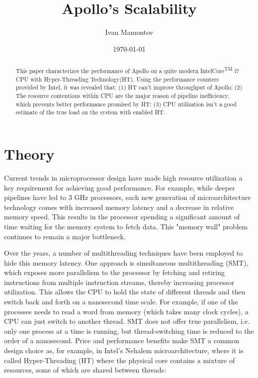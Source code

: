 \documentclass[12pt]{article}
\title{Apollo's Scalability}
\date{\today}
\author{Ivan Mamontov}
\begin{document}
\maketitle

\tableofcontents{}

\begin{abstract}

This paper characterizes the performance of Apollo on a quite modern Intel\circledR Core\textsuperscript{TM} i7 CPU with Hyper-Threading Technology(HT). Using the performance counters provided by Intel, it was revealed that: (1) HT can't improve throughput of Apollo; (2) The resource contentions within CPU are the major reason of pipeline inefficiency, which prevents better performance promised by HT; (3) CPU utilization isn't a good estimate of the true load on the system with enabled HT.

\end{abstract}

\section{Theory}

Current trends in microprocessor design have made high resource utilization a key requirement for achieving good performance. For example, while deeper pipelines have led to 3 GHz processors, each new generation of microarchitecture technology comes with increased memory latency and a decrease in relative memory speed. This results in the processor spending a significant amount of time waiting for the memory system to fetch data. This "memory wall" problem continues to remain a major bottleneck\cite{impact}.

Over the years, a number of multithreading techniques have been employed to hide this memory latency. One approach is simultaneous multithreading (SMT), which exposes more parallelism to the processor by fetching and retiring instructions from multiple instruction streams, thereby increasing processor utilization. This allows the CPU to hold the state of different threads and then switch back and forth on a nanosecond time scale. For example, if one of the processes needs to read a word from memory (which takes many clock cycles), a CPU can just switch to another thread. SMT does not offer true parallelism, i.e. only one process at a time is running, but thread-switching time is reduced to the order of a nanosecond\cite{tanenbaum}. Price and performance benefits make SMT a common design choice as, for example, in Intel's Nehalem microarchitecture, where it is called Hyper-Threading (HT) where the physical core contains a mixture of resources, some of which are shared between threads\cite{intel}:
\end{document}
